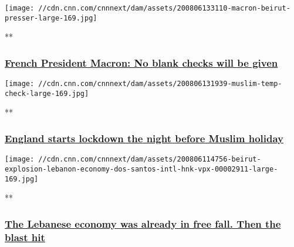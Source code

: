 \href{/videos/world/2020/08/06/emmanuel-macron-lebanon-leaders-blank-check-sot-vpx.afptv/video/playlists/around-the-world/}{}

\texttt{[image: //cdn.cnn.com/cnnnext/dam/assets/200806133110-macron-beirut-presser-large-169.jpg]}

**

\hypertarget{french-president-macron-no-blank-checks-will-be-given}{%
\subsubsection{\texorpdfstring{\href{/videos/world/2020/08/06/emmanuel-macron-lebanon-leaders-blank-check-sot-vpx.afptv/video/playlists/around-the-world/}{French
President Macron: No blank checks will be
given}}{French President Macron: No blank checks will be given}}\label{french-president-macron-no-blank-checks-will-be-given}}

\href{/videos/world/2020/08/06/england-lockdown-on-eid-eve-muslims-veselinovic-vpx.cnn/video/playlists/around-the-world/}{}

\texttt{[image: //cdn.cnn.com/cnnnext/dam/assets/200806131939-muslim-temp-check-large-169.jpg]}

**

\hypertarget{england-starts-lockdown-the-night-before-muslim-holiday}{%
\subsubsection{\texorpdfstring{\href{/videos/world/2020/08/06/england-lockdown-on-eid-eve-muslims-veselinovic-vpx.cnn/video/playlists/around-the-world/}{England
starts lockdown the night before Muslim
holiday}}{England starts lockdown the night before Muslim holiday}}\label{england-starts-lockdown-the-night-before-muslim-holiday}}

\href{/videos/business/2020/08/06/beirut-explosion-lebanon-economy-dos-santos-intl-hnk-vpx.cnn/video/playlists/around-the-world/}{}

\texttt{[image: //cdn.cnn.com/cnnnext/dam/assets/200806114756-beirut-explosion-lebanon-economy-dos-santos-intl-hnk-vpx-00002911-large-169.jpg]}

**

\hypertarget{the-lebanese-economy-was-already-in-free-fall-then-the-blast-hit}{%
\subsubsection{\texorpdfstring{\href{/videos/business/2020/08/06/beirut-explosion-lebanon-economy-dos-santos-intl-hnk-vpx.cnn/video/playlists/around-the-world/}{The
Lebanese economy was already in free fall. Then the blast
hit}}{The Lebanese economy was already in free fall. Then the blast hit}}\label{the-lebanese-economy-was-already-in-free-fall-then-the-blast-hit}}

